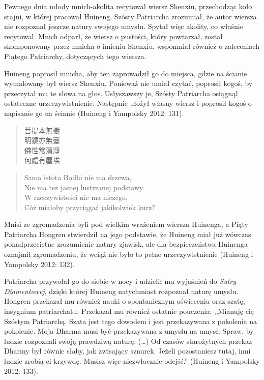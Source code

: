 Pewnego dnia młody mnich-akolita recytował wiersz Shenxiu, przechodząc koło stajni, w której pracował Huineng. Szósty Patriarcha zrozumiał, że autor wiersza nie rozpoznał jeszcze natury swojego umysłu. Spytał więc akolity, co właśnie recytował. Mnich odparł, że wiersz o pustości, który powtarzał, został skomponowany przez mnicha o imieniu Shenxiu, wspomniał również o zaleceniach Piątego Patriarchy, dotyczących tego wiersza.

Huineng poprosił mnicha, aby ten zaprowadził go do miejsca, gdzie na ścianie wymalowany był wiersz Shenxiu. Ponieważ nie umiał czytać, poprosił kogoś, by przeczytał mu te słowa na głos. Usłyszawszy je, Szósty Patriarcha osiągnął ostateczne urzeczywistnienie. Następnie ułożył własny wiersz i poprosił kogoś o napisanie go na ścianie (Huineng i Yampolsky 2012: 131).

\begin{minipage}[t]{0.4\textwidth}
\begin{verse}
菩提本無樹\\
明鏡亦無臺\\
佛性常清淨\\
何處有塵埃
\end{verse}
\end{minipage}
\begin{minipage}[t]{0.6\textwidth}
\itshape
\begin{verse}
Sama istota Bodhi nie ma drzewa,\\
Nie ma też jasnej lustrzanej podstawy.\\
W rzeczywistości nie ma niczego,\\
Cóż miałoby przyciągać jakikolwiek kurz?
\end{verse}
\end{minipage}
\label{HuinengVerse}
\vspace*{6pt}

Mnisi ze zgromadzenia byli pod wielkim wrażeniem wiersza Huinenga, a Piąty Patriarcha Hongren stwierdził na jego podstawie, że Huineng miał już wówczas ponadprzeciętne zrozumienie natury zjawisk, ale dla bezpieczeństwa Huinenga oznajmił zgromadzeniu, że wciąż nie było to pełne urzeczywistnienie (Huineng i Yampolsky 2012: 132).

Patriarcha przywołał go do siebie w nocy i udzielił mu wyjaśnień do \textit{Sutry Diamentowej}, dzięki której Huineng natychmiast rozpoznał naturę umysłu. Hongren przekazał mu również nauki o spontanicznym oświeceniu oraz szatę, insygnium patriarchatu. Przekazał mu również ostatnie pouczenia: ,,Mianuję cię Szóstym Patriarchą. Szata jest tego dowodem i jest przekazywana z pokolenia na pokolenie. Moja Dharma musi być przekazywana z umysłu na umysł. Spraw, by ludzie rozpoznali swoją prawdziwą naturę. (\ldots) Od czasów starożytnych przekaz Dharmy był równie słaby, jak zwisający sznurek. Jeżeli pozostaniesz tutaj, inni ludzie zrobią ci krzywdę. Musisz więc niezwłocznie odejść.'' (Huineng i Yampolsky 2012: 133).

